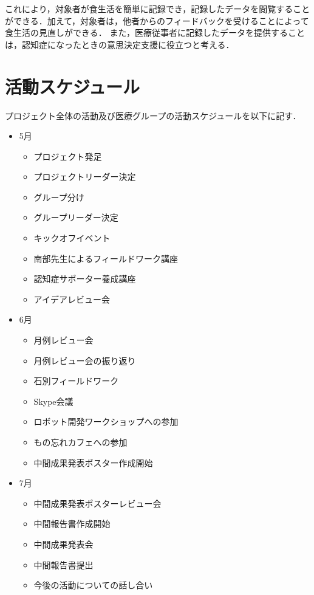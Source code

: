 \documentclass[../report]{subfiles}
\begin{document}
これにより，対象者が食生活を簡単に記録でき，記録したデータを閲覧することができる．加えて，対象者は，他者からのフィードバックを受けることによって食生活の見直しができる．
また，医療従事者に記録したデータを提供することは，認知症になったときの意思決定支援に役立つと考える．


\section{活動スケジュール}
プロジェクト全体の活動及び医療グループの活動スケジュールを以下に記す．

\begin{itemize}
  \item[] 5月
    \begin{itemize}
      \item プロジェクト発足
      \item プロジェクトリーダー決定
      \item グループ分け
      \item グループリーダー決定
      \item キックオフイベント
      \item 南部先生によるフィールドワーク講座
      \item 認知症サポーター養成講座
      \item アイデアレビュー会
    \end{itemize}
  \item[] 6月
    \begin{itemize}
      \item 月例レビュー会
      \item 月例レビュー会の振り返り
      \item 石別フィールドワーク
      \item Skype会議
      \item ロボット開発ワークショップへの参加
      \item もの忘れカフェへの参加
      \item 中間成果発表ポスター作成開始
    \end{itemize}
  \item[] 7月
    \begin{itemize}
      \item 中間成果発表ポスターレビュー会
      \item 中間報告書作成開始
      \item 中間成果発表会
      \item 中間報告書提出
      \item 今後の活動についての話し合い

\end{itemize}
\end{itemize}
\end{document}
